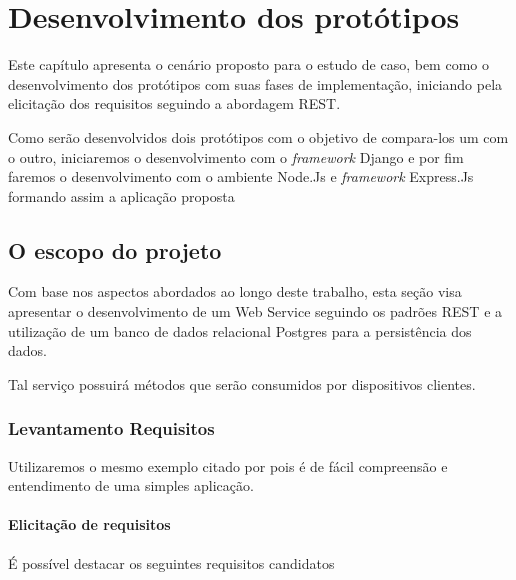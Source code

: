 
\chapter{Desenvolvimento dos protótipos}
\label{desenvolvimento-prototipos}

\vspace{-1.9cm}


  Este capítulo apresenta o cenário proposto para o estudo de caso, bem
  como o desenvolvimento dos protótipos com suas fases de implementação, iniciando
  pela elicitação dos requisitos seguindo a abordagem \ac{REST}.
  
  Como serão desenvolvidos dois protótipos com o objetivo de compara-los um com o outro,
  iniciaremos o desenvolvimento com o \textit{framework} Django e por fim faremos o desenvolvimento
  com o ambiente Node.Js e \textit{framework} Express.Js formando assim a aplicação proposta
  
\section{O escopo do projeto}
\label{escopo-projeto}

  Com base nos aspectos abordados ao longo deste trabalho, 
  esta seção visa apresentar o desenvolvimento de um Web Service seguindo os padrões \ac{REST} e a utilização 
  de um banco de dados relacional Postgres para a persistência dos dados.
  
  Tal serviço possuirá métodos que serão consumidos por dispositivos clientes.

\subsection{Levantamento Requisitos}
\label{levantamento-requisitos}

  Utilizaremos o mesmo exemplo citado por  pois é de fácil compreensão
  e entendimento de uma simples aplicação.

\subsubsection{Elicitação de requisitos}

  É possível destacar os seguintes requisitos candidatos


